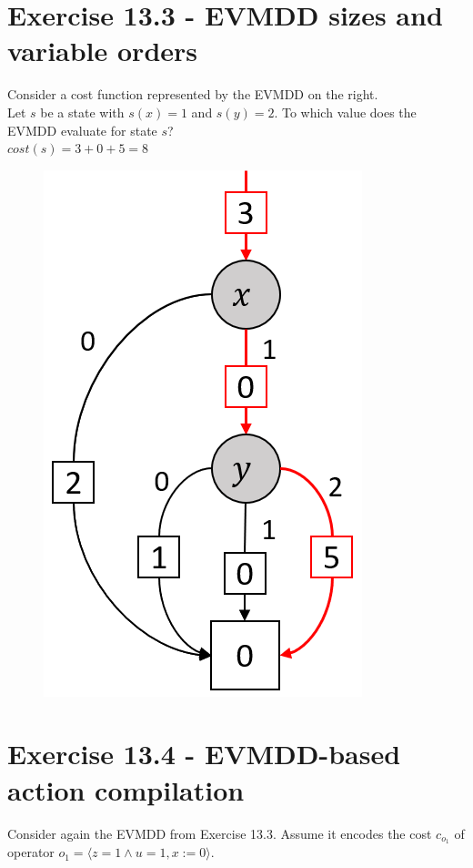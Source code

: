 \documentclass[11pt,a4paper]{article}
\begin{document}
\section*{Exercise 13.3 - EVMDD sizes and variable orders}
Consider a cost function represented by the EVMDD on the right.\\
Let $s$ be a state with $s(x) = 1$ and $s(y) = 2$. To which value does the
EVMDD evaluate for state $s$?\\
$cost(s) = 3 + 0 + 5 = 8$
\begin{figure}[h!]
	\centering
	\includegraphics[scale=0.5]{13_3.png}
\end{figure}
\section*{Exercise 13.4 - EVMDD-based action compilation}
Consider again the EVMDD from Exercise 13.3. Assume it encodes the cost $c_{o_1}$ of operator $o_1 = \langle z = 1 \land u = 1, x := 0\rangle$.
\end{document}
